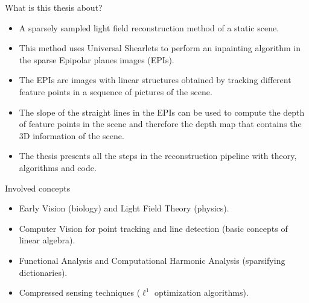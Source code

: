 \begin{frame}{What is this thesis about?}
\begin{block}{}
\begin{itemize}
\item A sparsely sampled light field reconstruction method of a static scene. 

\bigskip
\pause
\item This method uses Universal Shearlets to perform an inpainting algorithm in the sparse Epipolar planes images (EPIs).

\bigskip 
\pause
\item The EPIs are images with linear structures obtained by tracking different feature points in a sequence of pictures of the scene. 

\bigskip
\pause
\item The slope of the straight lines in the EPIs can be used to compute the depth of feature points in the scene and therefore the depth map that contains the 3D information of the scene.

\bigskip
\pause
\item The thesis presents all the steps in the reconstruction pipeline with theory, algorithms and code. 
\end{itemize} 
\end{block}
\end{frame}

\begin{frame}{Involved concepts}
\begin{block}{}
\begin{itemize}
\item Early Vision (biology) and Light Field Theory (physics).

\bigskip
\pause
\item Computer Vision for point tracking and line detection (basic concepts of linear algebra).

\bigskip 
\pause
\item Functional Analysis and Computational Harmonic Analysis (sparsifying dictionaries).

\bigskip
\pause
\item Compressed sensing techniques ($\ell^1$ optimization algorithms). 
\end{itemize}
\end{block}
\end{frame}

